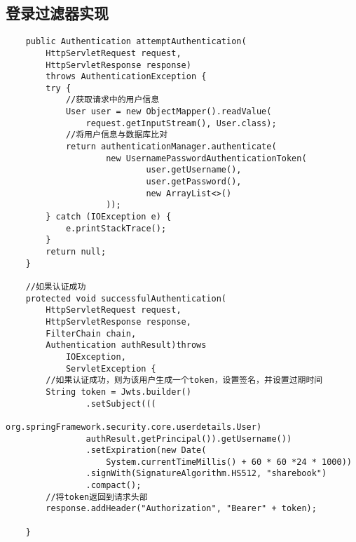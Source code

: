 \subsection{登录过滤器实现}
\begin{verbatim}
    public Authentication attemptAuthentication(
        HttpServletRequest request, 
        HttpServletResponse response) 
        throws AuthenticationException {
        try {
            //获取请求中的用户信息
            User user = new ObjectMapper().readValue(
                request.getInputStream(), User.class);
            //将用户信息与数据库比对
            return authenticationManager.authenticate(
                    new UsernamePasswordAuthenticationToken(
                            user.getUsername(),
                            user.getPassword(),
                            new ArrayList<>()
                    ));
        } catch (IOException e) {
            e.printStackTrace();
        }
        return null;
    }

    //如果认证成功
    protected void successfulAuthentication(
        HttpServletRequest request, 
        HttpServletResponse response,
        FilterChain chain,
        Authentication authResult)throws 
            IOException,
            ServletException {
        //如果认证成功，则为该用户生成一个token，设置签名，并设置过期时间
        String token = Jwts.builder()
                .setSubject(((
                    org.springFramework.security.core.userdetails.User) 
                authResult.getPrincipal()).getUsername())
                .setExpiration(new Date(
                    System.currentTimeMillis() + 60 * 60 *24 * 1000))
                .signWith(SignatureAlgorithm.HS512, "sharebook")
                .compact();
        //将token返回到请求头部
        response.addHeader("Authorization", "Bearer" + token);

    }
\end{verbatim}

